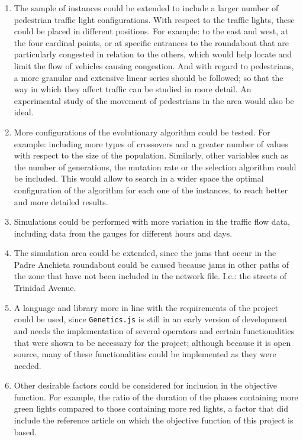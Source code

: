 \begin{enumerate}
    \item The sample of instances could be extended to include a larger number of pedestrian traffic light configurations. With respect to the traffic lights, these could be placed in different positions. For example: to the east and west, at the four cardinal points, or at specific entrances to the roundabout that are particularly congested in relation to the others, which would help locate and limit the flow of vehicles causing congestion. And with regard to pedestrians, a more granular and extensive linear series should be followed; so that the way in which they affect traffic can be studied in more detail. An experimental study of the movement of pedestrians in the area would also be ideal.

    \item More configurations of the evolutionary algorithm could be tested. For example: including more types of crossovers and a greater number of values with respect to the size of the population. Similarly, other variables such as the number of generations, the mutation rate or the selection algorithm could be included. This would allow to search in a wider space the optimal configuration of the algorithm for each one of the instances, to reach better and more detailed results.

    \item Simulations could be performed with more variation in the traffic flow data, including data from the gauges for different hours and days.

    \item The simulation area could be extended, since the jams that occur in the Padre Anchieta roundabout could be caused because jams in other paths of the zone that have not been included in the network file. I.e.: the streets of Trinidad Avenue.

    \item A language and library more in line with the requirements of the project could be used, since \texttt{Genetics.js} is still in an early version of development and needs the implementation of several operators and certain functionalities that were shown to be necessary for the project; although because it is open source, many of these functionalities could be implemented as they were needed.

    \item Other desirable factors could be considered for inclusion in the objective function. For example, the ratio of the duration of the phases containing more green lights compared to those containing more red lights, a factor that did include the reference article on which the objective function of this project is based.


\end{enumerate}
